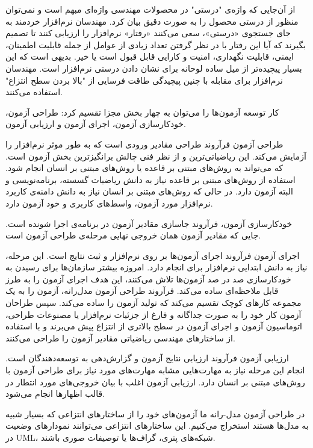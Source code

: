 از آن‌جایی که واژه‌ی "درستی" در محصولات مهندسی واژه‌ای مبهم است و نمی‌توان منظور از درستی محصول را به صورت دقیق بیان کرد. مهندسان نرم‌افزار خردمند به جای جستجوی «درستی»، سعی می‌کنند «رفتار» نرم‌افزار را ارزیابی کنند تا تصمیم بگیرند که آیا این رفتار با در نظر گرفتن تعداد زیادی از عوامل از جمله قابلیت اطمینان، ایمنی، قابلیت نگهداری، امنیت و کارایی قابل قبول است یا خیر. بدیهی است که این بسیار پیچیده‌تر از میل ساده لوحانه برای نشان دادن درستی نرم‌افزار است. مهندسان نرم‌افزار برای مقابله با چنین پیچیدگی طاقت فرسایی از "بالا بردن سطح انتزاع" استفاده می‌کنند.
 
کار توسعه آزمون‌ها را می‌توان به چهار بخش مجزا تقسیم کرد: طراحی آزمون، خودکارسازی آزمون، اجرای آزمون و ارزیابی آزمون.


 طراحی آزمون فرآروند طراحی مقادیر ورودی است که به طور موثر نرم‌افزار را آزمایش می‌‌کند. این ریاضیاتی‌ترین و از نظر فنی چالش برانگیزترین بخش آزمون است. که می‌تواند به روش‌های مبتنی بر قاعده یا روش‌های مبتنی بر انسان انجام شود. استفاده از روش‌های مبتنی بر قاعده نیاز به دانش ریاضیات گسسته، برنامه‌نویسی و البته آزمون دارد. در حالی که روش‌های مبتنی بر انسان نیاز به دانش دامنه‌ی کاربرد نرم‌افزار مورد آزمون، واسط‌های کاربری و خود آزمون دارد.

 خودکارسازی آزمون، فرآروند جاسازی مقادیر آزمون در برنامه‌ی اجرا شونده است. جایی که مقادیر آزمون همان خروجی نهایی مرحله‌ی طراحی آزمون است.

 اجرای آزمون فرآروند اجرای آزمون‌ها بر روی نرم‌افزار و ثبت نتایج است. این مرحله، نیاز به دانش ابتدایی نرم‌افزار برای انجام دارد. امروزه بیشتر سازمان‌ها برای رسیدن به خودکارسازی صد در صد آزمون‌ها تلاش می‌کنند، این هدف اجرای آزمون‌ را به طرز قابل ملاحظه‌ای ساده می‌کند.
فرآروند طراحی آزمون مدل‌رانه، آزمون را به یک مجموعه کارهای کوچک تقسیم می‌کند که تولید آزمون را ساده می‌کند. سپس طراحان آزمون کار خود را به صورت جداگانه و فارغ از جزئیات نرم‌افزار یا مصنوعات طراحی، اتوماسیون آزمون و اجرای آزمون در سطح بالاتری از انتزاع پیش می‌برند و با استفاده از ساختارهای مهندسی ریاضیاتی مقادیر آزمون را طراحی می‌کنند. 

 ارزیابی آزمون فرآروند ارزیابی نتایج آزمون و گزارش‌دهی به توسعه‌دهندگان است. انجام این مرحله نیاز به مهارت‌هایی مشابه مهارت‌های مورد نیاز برای طراحی آزمون با روش‌های مبتنی بر انسان دارد. ارزیابی آزمون اغلب با بیان خروجی‌های مورد انتطار در قالب  اظهارها انجام می‌شود.





در طراحی آزمون مدل-رانه ما آزمون‌های خود را از ساختارهای انتزاعی که بسیار شبیه به مدل‌ها هستند استخراج می‌کنیم. این ساختارهای انتزاعی می‌توانند نمودارهای وضعیت در UML، شبکه‌های پتری، گراف‌ها یا توصیفات صوری باشند. 

